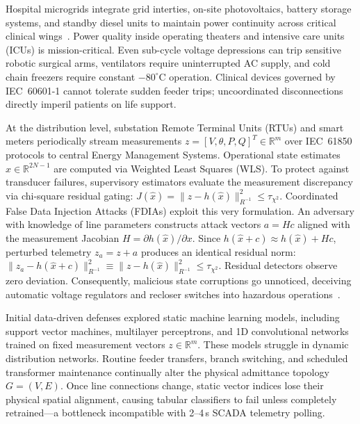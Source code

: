 \documentclass[runningheads]{llncs}
\begin{document}
Hospital microgrids integrate grid interties, on-site photovoltaics, battery storage systems, and standby diesel units to maintain power continuity across critical clinical wings~\cite{coventry2018cybersecurity,newaz2021survey}.
Power quality inside operating theaters and intensive care units (ICUs) is mission-critical.
Even sub-cycle voltage depressions can trip sensitive robotic surgical arms, ventilators require uninterrupted AC supply, and cold chain freezers require constant $-80^{\circ}\text{C}$ operation.
Clinical devices governed by IEC~60601-1 cannot tolerate sudden feeder trips; uncoordinated disconnections directly imperil patients on life support.

At the distribution level, substation Remote Terminal Units (RTUs) and smart meters periodically stream measurements $z = [V, \theta, P, Q]^T \in \mathbb{R}^m$ over IEC~61850 protocols to central Energy Management Systems.
Operational state estimates $\hat{x} \in \mathbb{R}^{2N-1}$ are computed via Weighted Least Squares (WLS).
To protect against transducer failures, supervisory estimators evaluate the measurement discrepancy via chi-square residual gating:
$J(\hat{x}) = \|z - h(\hat{x})\|_{R^{-1}}^2 \le \tau_{\chi^2}$.
Coordinated False Data Injection Attacks (FDIAs) exploit this very formulation.
An adversary with knowledge of line parameters constructs attack vectors $a = Hc$ aligned with the measurement Jacobian $H = \partial h(\hat{x})/\partial x$.
Since $h(\hat{x} + c) \approx h(\hat{x}) + Hc$, perturbed telemetry $z_a = z + a$ produces an identical residual norm: $\|z_a - h(\hat{x} + c)\|_{R^{-1}}^2 \equiv \|z - h(\hat{x})\|_{R^{-1}}^2 \le \tau_{\chi^2}$.
Residual detectors observe zero deviation.
Consequently, malicious state corruptions go unnoticed, deceiving automatic voltage regulators and recloser switches into hazardous operations~\cite{liu2011false,liang2017review}.

Initial data-driven defenses explored static machine learning models, including support vector machines, multilayer perceptrons, and 1D convolutional networks~\cite{he2017real,beg2020detection} trained on fixed measurement vectors $z \in \mathbb{R}^m$.
These models struggle in dynamic distribution networks.
Routine feeder transfers, branch switching, and scheduled transformer maintenance continually alter the physical admittance topology $G = (V,E)$.
Once line connections change, static vector indices lose their physical spatial alignment, causing tabular classifiers to fail unless completely retrained---a bottleneck incompatible with 2--4\,s SCADA telemetry polling.
\end{document}
